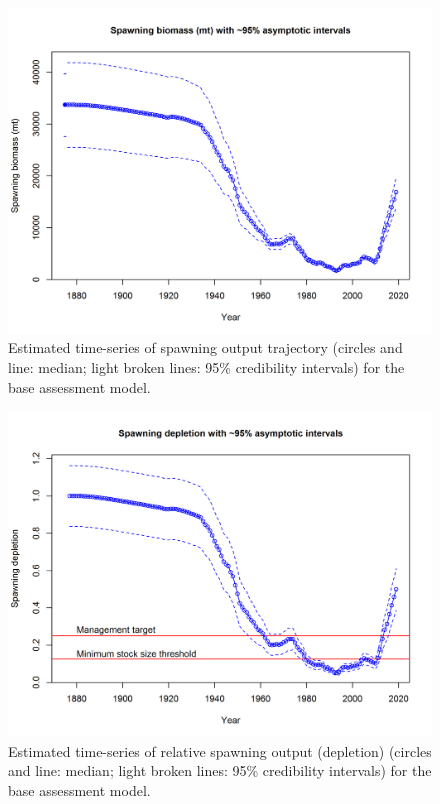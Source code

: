 \documentclass[12pt,]{article}
\begin{document}
\begin{figure}
\centering
\includegraphics{r4ss/plots_mod1/ts7_Spawning_biomass_(mt)_with_95_asymptotic_intervals_intervals.png}
\caption{Estimated time-series of spawning output trajectory (circles
and line: median; light broken lines: 95\% credibility intervals) for
the base assessment model. \label{fig:Spawnbio_all}}
\end{figure}

\begin{figure}
\centering
\includegraphics{r4ss/plots_mod1/ts9_Spawning_depletion_with_95_asymptotic_intervals_intervals.png}
\caption{Estimated time-series of relative spawning output (depletion)
(circles and line: median; light broken lines: 95\% credibility
intervals) for the base assessment model. \label{fig:RelDeplete_all}}
\end{figure}
\end{document}
